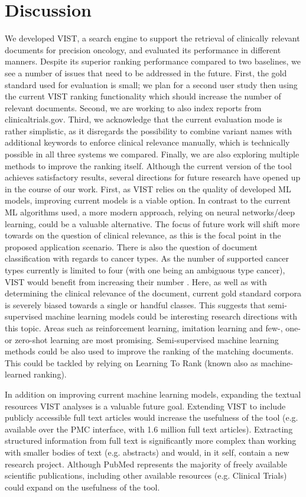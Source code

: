 \documentclass[fleqn,10pt]{wlscirep}
\begin{document}
\section*{Discussion}
We developed VIST, a search engine to support the retrieval of clinically relevant documents for precision oncology, and evaluated its performance in different manners. Despite its superior ranking performance compared to two baselines, we see a number of issues that need to be addressed in the future. First, the gold standard used for evaluation is small; we plan for a second user study then using the current VIST ranking functionality which should increase the number of relevant documents. Second, we are working to also index reports from clinicaltrials.gov. Third, we acknowledge that the current evaluation mode is rather simplistic, as it disregards the possibility to combine variant names with additional keywords to enforce clinical relevance manually, which is technically possible in all three systems we compared. Finally, we are also exploring multiple methods to improve the ranking itself.
Although the current version of the tool achieves satisfactory results, several directions for future research have opened up in the course of our work. First, as VIST
relies on the quality of developed ML models, improving current models is a viable option. In contrast to the current ML algorithms used, a more modern approach, relying on neural networks/deep learning, could be a valuable alternative. The focus of future work will shift more towards on the question of clinical relevance, as this is the focal point in the proposed application scenario. There is also the question of document classification with regards to cancer types. As the number of supported cancer types currently is limited to four (with one being an ambiguous type cancer), VIST would benefit from increasing their number . Here, as well as with determining the clinical relevance of the document, current gold standard corpora is severely biased towards a single or handful classes. This suggests that semi-supervised machine learning models could be interesting research directions with this topic. Areas such as reinforcement learning, imitation learning and few-, one- or zero-shot learning are most promising. Semi-supervised machine learning methods could be also used to improve the ranking of the matching documents. This could be tackled by relying on Learning To Rank (known also as machine-learned ranking).

In addition on improving current machine learning models, expanding the textual resources VIST analyses is a valuable future goal. Extending VIST to include publicly accessible full text articles would increase the usefulness of the tool (e.g. available over the PMC interface, with 1.6 million full text articles). Extracting structured information from full text is significantly more complex than working with smaller bodies of text (e.g. abstracts) and would, in it self, contain a new research project. Although PubMed represents the majority of freely available scientific publications, including other available resources (e.g. Clinical Trials) could expand on the usefulness of the tool. 
\end{document}
